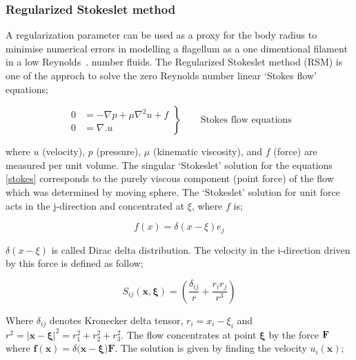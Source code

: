 \documentclass[12pt,a4paper,titlepage]{report}
\begin{document}
 





\subsubsection{Regularized Stokeslet method}\label{method2}

A regularization parameter can be used as a proxy for the body radius to minimise numerical errors
 in modelling a flagellum as a one dimentional filament in a low Reynolds~\citep{smith2009boundary}.
number fluids. The Regularized Stokeslet method (RSM) is one of the approch to solve the zero 
Reynolds number linear \lq{}Stokes flow\rq{} equations;



\begin{equation}
 \left.\begin{aligned}
        0 &= - \nabla p + \mu \nabla ^ 2 u + f \\
        0 &=\nabla . u
       \end{aligned}
 \right\}
 \qquad \text{Stokes flow equations}
\label{stokes}
\end{equation}

where $u$ (velocity), $p$ (pressure), $\mu $ (kinematic viscosity), and $f$ (force) are measured per unit
volume. The singular \lq{}Stokeslet\rq{} solution for the equations \ref{stokes} corresponds to the purely 
viscous component (point force) of the flow which was determined by moving sphere. 
The \lq{}Stokeslet\rq{} solution for unit force acts in the j-direction and concentrated at $\xi $, where $f$ is;
  

\begin{equation}
 f (x) = \delta (x - \xi) e_j 
\label{force}
\end{equation}

$\delta (x - \xi)$ is called Dirac delta distribution. The velocity in the i-direction driven by this force is defined
 as follow;


\begin{equation}
 S _{ij} \bm{(x , \xi)} = (\frac{\delta _{ij}}{r} + \frac{r_i r_j}{r^3})
\label{i-direction}
\end{equation}

Where $\delta _{ij}$ denotes Kronecker delta tensor, $r_i = x_i - \xi _i$ and $r^2 =| \bm{x}- \bm{\xi} |^2 = r_1 ^2 + r_2 ^ 2 + r_3 ^2$.
The flow concentrates at point $\bm \xi$ by the force $\bold F$ where $ \bm{f (x)} = \delta (\bm{x} - \bm{\xi) F}$.
The solution is given by finding the velocity $u_i(\bm x)$;
\end{document}
